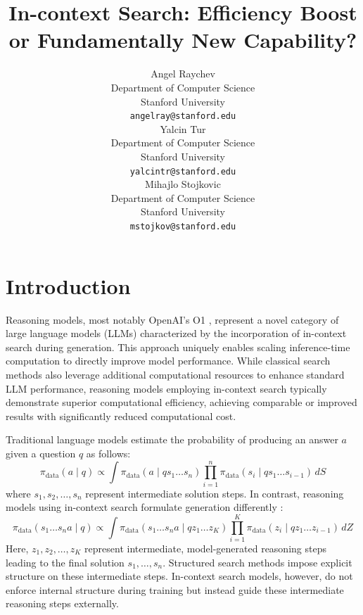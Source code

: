 \documentclass{article}
\title{In-context Search: Efficiency Boost or Fundamentally New Capability?}
\author{%
  Angel Raychev \\
  Department of Computer Science\\
  Stanford University\\
  \texttt{angelray@stanford.edu} \\
  \And
  Yalcin Tur \\
  Department of Computer Science\\
  Stanford University\\
  \texttt{yalcintr@stanford.edu} \\
  \And
  Mihajlo Stojkovic\\
  Department of Computer Science\\
  Stanford University\\
  \texttt{mstojkov@stanford.edu} \\
}
\begin{document}


\maketitle


\section{Introduction}

Reasoning models, most notably OpenAI's O1 \cite{openai-o1-2412.16720}, represent a novel category of large language models (LLMs) characterized by the incorporation of in-context search during generation. This approach uniquely enables scaling inference-time computation to directly improve model performance. While classical search methods also leverage additional computational resources to enhance standard LLM performance, reasoning models employing in-context search typically demonstrate superior computational efficiency, achieving comparable or improved results with significantly reduced computational cost.

Traditional language models estimate the probability of producing an answer \( a \) given a question \( q \) as follows:
\begin{equation}
    \pi_{\text{data}}(a \mid q) \propto \int \pi_{\text{data}}(a \mid qs_1 \dots s_n) \prod_{i=1}^n \pi_{\text{data}}(s_i \mid q s_1\ldots s_{i-1})\, dS
\end{equation}
where \( s_1, s_2, \dots, s_n \) represent intermediate solution steps. In contrast, reasoning models using in-context search formulate generation differently \cite{xiang2025towards}:
\begin{equation}
    \pi_{\text{data}}(s_1 \dots s_n a\mid q) \propto
\int \pi_{\text{data}}(s_1 \dots s_n a\mid q z_1 \dots z_K)  \prod_{i=1}^K \pi_{\text{data}}(z_i \mid q z_1\ldots z_{i-1})\, dZ
\end{equation}
Here, \( z_1, z_2, \dots, z_K \) represent intermediate, model-generated reasoning steps leading to the final solution \( s_1, \dots, s_n \). Structured search methods impose explicit structure on these intermediate steps. In-context search models, however, do not enforce internal structure during training but instead guide these intermediate reasoning steps externally.
\end{document}
